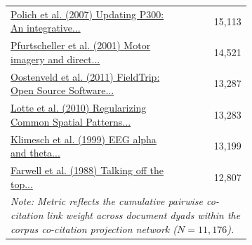 \begin{table}[htbp]
\begin{tabular}{p{0.68\linewidth} r}
\href{https://doi.org/10.1016/j.clinph.2007.04.019}{Polich et al. (2007) Updating P300: An integrative...} & 15,113 \\
\href{https://doi.org/10.1109/5.939829}{Pfurtscheller et al. (2001) Motor imagery and direct...} & 14,521 \\
\href{https://doi.org/10.1155/2011/156869}{Oostenveld et al. (2011) FieldTrip: Open Source Software...} & 13,287 \\
\href{https://doi.org/10.1109/tbme.2010.2082539}{Lotte et al. (2010) Regularizing Common Spatial Patterns...} & 13,283 \\
\href{https://doi.org/10.1016/s0165-0173(98)00056-3}{Klimesch et al. (1999) EEG alpha and theta...} & 13,199 \\
\href{https://doi.org/10.1016/0013-4694(88)90149-6}{Farwell et al. (1988) Talking off the top...} & 12,807 \\
\bottomrule
\multicolumn{2}{p{0.88\linewidth}}{\scriptsize \textit{Note: Metric reflects the cumulative pairwise co-citation link weight across document dyads within the corpus co-citation projection network ($N=11{,}176$).}} \\
\end{tabular}
\end{table}